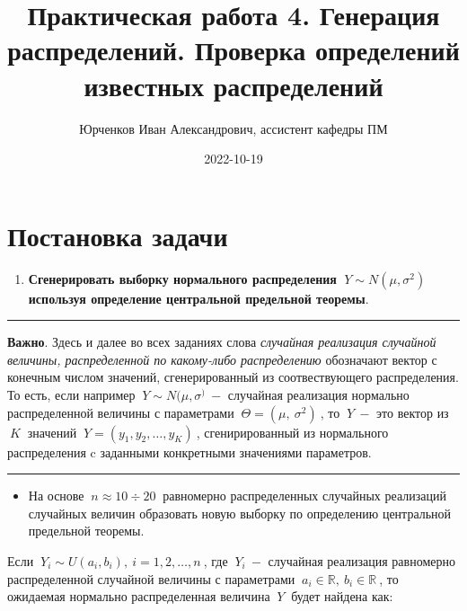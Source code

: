 \documentclass[
]{article}
\title{Практическая работа 4. Генерация распределений. Проверка
определений известных распределений}
\author{Юрченков Иван Александрович, ассистент кафедры ПМ}
\date{2022-10-19}
\providecommand{\tightlist}{%
  \setlength{\itemsep}{0pt}\setlength{\parskip}{0pt}}
\begin{document}
\maketitle

\hypertarget{ux43fux43eux441ux442ux430ux43dux43eux432ux43aux430-ux437ux430ux434ux430ux447ux438}{%
\section{\texorpdfstring{\textbf{Постановка
задачи}}{Постановка задачи}}\label{ux43fux43eux441ux442ux430ux43dux43eux432ux43aux430-ux437ux430ux434ux430ux447ux438}}

\begin{enumerate}
\def\labelenumi{\arabic{enumi}.}
\tightlist
\item
  \textbf{Сгенерировать выборку нормального распределения
  \(\ Y \sim N(\mu, \sigma^2)\ \) используя определение центральной
  предельной теоремы}.
\end{enumerate}

\begin{center}\rule{0.5\linewidth}{0.5pt}\end{center}

\textbf{Важно}. Здесь и далее во всех заданиях слова \emph{случайная
реализация случайной величины, распределенной по какому-либо
распределению} обозначают вектор с конечным числом значений,
сгенерированный из соотвествующего распределения. То есть, если например
\(\ Y \sim N(\mu, \sigma^)\ -\) случайная реализация нормально
распределенной величины с параметрами \(\ \Theta = (\mu,\ \sigma^2)\ \),
то \(\ Y\ -\) это вектор из \(\ K\ \) значений
\(\ Y = (y_1, y_2, \dots, y_K)\ \), сгенирированный из нормального
распределения c заданными конкретными значениями параметров.

\begin{center}\rule{0.5\linewidth}{0.5pt}\end{center}

\begin{itemize}
\tightlist
\item
  На основе \(\ n \approx 10\div 20\ \) равномерно распределенных
  случайных реализаций случайных величин образовать новую выборку по
  определению центральной предельной теоремы.
\end{itemize}

Если \(\ Y_{i} \sim U(a_i, b_i), \ i = 1, 2, \dots, n\ \), где
\(\ Y_{i}\ -\) случайная реализация равномерно распределенной случайной
величины с параметрами \(\ a_i \in \mathbb{R},\ b_i \in \mathbb{R}\ \),
то ожидаемая нормально распределенная величина \(\ Y\ \) будет найдена
как:
\end{document}
